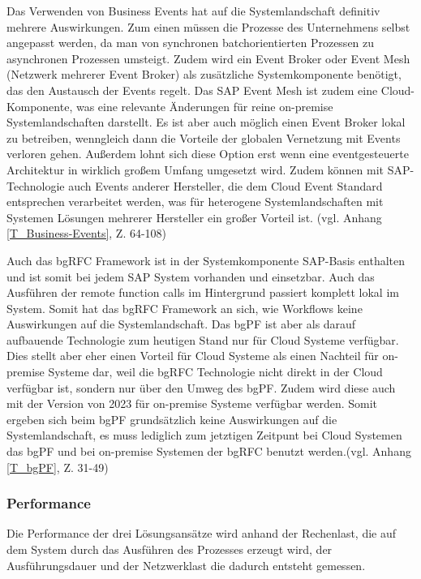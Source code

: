 Das Verwenden von Business Events hat auf die Systemlandschaft definitiv mehrere Auswirkungen. Zum einen müssen die Prozesse des Unternehmens selbst angepasst werden, da man von synchronen batchorientierten Prozessen zu asynchronen Prozessen umsteigt. Zudem wird ein Event Broker oder Event Mesh (Netzwerk mehrerer Event Broker) als zusätzliche Systemkomponente benötigt, das den Austausch der Events regelt. Das SAP Event Mesh ist zudem eine Cloud-Komponente, was eine relevante Änderungen für reine on-premise Systemlandschaften darstellt. Es ist aber auch möglich einen Event Broker lokal zu betreiben, wenngleich dann die Vorteile der globalen Vernetzung mit Events verloren gehen. Au{\ss}erdem lohnt sich diese Option erst wenn eine eventgesteuerte Architektur in wirklich gro{\ss}em Umfang umgesetzt wird. Zudem können mit SAP-Technologie auch Events anderer Hersteller, die dem Cloud Event Standard entsprechen verarbeitet werden, was für heterogene Systemlandschaften mit Systemen Lösungen mehrerer Hersteller ein gro{\ss}er Vorteil ist. (vgl. Anhang \ref{T_Business-Events}, Z. 64-108)

Auch das bgRFC Framework ist in der Systemkomponente SAP-Basis enthalten und ist somit bei jedem SAP System vorhanden und einsetzbar. Auch das Ausführen der remote function calls im Hintergrund passiert komplett lokal im System. Somit hat das bgRFC Framework an sich, wie Workflows keine Auswirkungen auf die Systemlandschaft. Das bgPF ist aber als darauf aufbauende Technologie zum heutigen Stand nur für Cloud Systeme verfügbar. Dies stellt aber eher einen Vorteil für Cloud Systeme als einen Nachteil für on-premise Systeme dar, weil die bgRFC Technologie nicht direkt in der Cloud verfügbar ist, sondern nur über den Umweg des bgPF. Zudem wird diese auch mit der Version von 2023 für on-premise Systeme verfügbar werden. Somit ergeben sich beim bgPF grundsätzlich keine Auswirkungen auf die Systemlandschaft, es muss lediglich zum jetztigen Zeitpunt bei Cloud Systemen das bgPF und bei on-premise Systemen der bgRFC benutzt werden.(vgl. Anhang \ref{T_bgPF}, Z. 31-49)

\subsubsection{Performance}

Die Performance der drei Lösungsansätze wird anhand der Rechenlast, die auf dem System durch das Ausführen des Prozesses erzeugt wird, der Ausführungsdauer und der Netzwerklast die dadurch entsteht gemessen.

